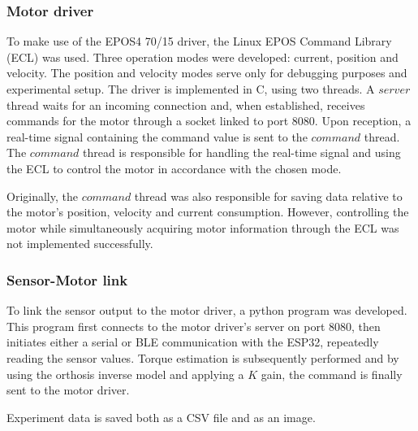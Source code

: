 \subsubsection{Motor driver}
To make use of the EPOS4 70/15 driver, the Linux EPOS Command Library (ECL) was used.  
Three operation modes were developed: current, position and velocity. The position 
and velocity modes serve only for debugging purposes and experimental setup. The driver
is implemented in C, using two threads. A $server$ thread waits for an incoming 
connection and, when established, receives commands for the motor through a socket 
linked to port 8080. Upon reception, a real-time signal containing the command value 
is sent to the $command$ thread. The $command$ thread is responsible for handling 
the real-time signal and using the ECL to control the motor in accordance with the 
chosen mode.  

Originally, the $command$ thread was also responsible for saving data relative to 
the motor's position, velocity and current consumption. However, controlling the 
motor while simultaneously acquiring motor information through the ECL was not 
implemented successfully.  
\FloatBarrier

\subsubsection{Sensor-Motor link}
To link the sensor output to the motor driver, a python program was developed. 
This program first connects to the motor driver's server on port 8080, then 
initiates either a serial or BLE communication with the ESP32, repeatedly reading 
the sensor values. Torque estimation is subsequently performed and by using the 
orthosis inverse model and applying a $K$ gain, the command is finally sent to 
the motor driver.  

Experiment data is saved both as a CSV file and as an image.  
